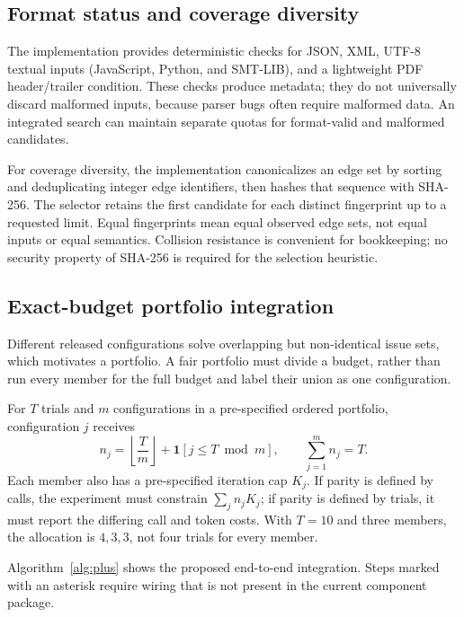 \documentclass{article}
\begin{document}
\subsection{Format status and coverage diversity}
\label{sec:design:diversity}

The implementation provides deterministic checks for JSON, XML, UTF-8 textual
inputs (JavaScript, Python, and SMT-LIB), and a lightweight PDF header/trailer
condition.  These checks produce metadata; they do not universally discard
malformed inputs, because parser bugs often require malformed data.  An
integrated search can maintain separate quotas for format-valid and malformed
candidates.

For coverage diversity, the implementation canonicalizes an edge set by
sorting and deduplicating integer edge identifiers, then hashes that sequence
with SHA-256.  The selector retains the first candidate for each distinct
fingerprint up to a requested limit.  Equal fingerprints mean equal observed
edge sets, not equal inputs or equal semantics.  Collision resistance is
convenient for bookkeeping; no security property of SHA-256 is required for
the selection heuristic.

\subsection{Exact-budget portfolio integration}
\label{sec:design:portfolio}

Different released configurations solve overlapping but non-identical issue
sets, which motivates a portfolio.  A fair portfolio must divide a budget,
rather than run every member for the full budget and label their union as one
configuration.

For $T$ trials and $m$ configurations in a pre-specified ordered portfolio,
configuration $j$ receives
\[
 n_j=\left\lfloor\frac{T}{m}\right\rfloor
     + \mathbf{1}\!\left[j\leq T\bmod m\right],
 \qquad \sum_{j=1}^{m}n_j=T.
\]
Each member also has a pre-specified iteration cap $K_j$.  If parity is defined
by calls, the experiment must constrain $\sum_j n_j K_j$; if parity is defined
by trials, it must report the differing call and token costs.  With $T=10$ and
three members, the allocation is $4,3,3$, not four trials for every member.

Algorithm~\ref{alg:plus} shows the proposed end-to-end integration.  Steps
marked with an asterisk require wiring that is not present in the current
component package.
\end{document}
